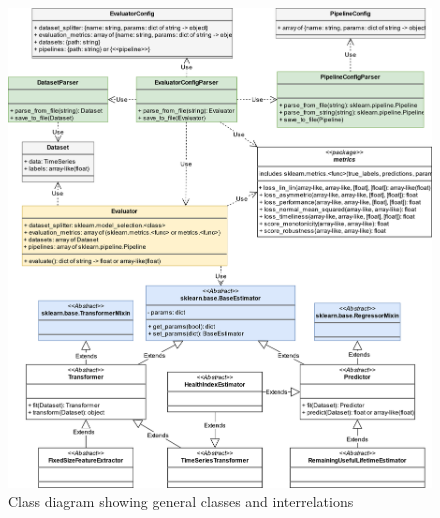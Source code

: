\begin{figure}[ht]
    \centering
    \includegraphics[width=\textwidth]{gfx/general_class_diagram}
    \caption{Class diagram showing general classes and interrelations}
    \label{fig:interfaces-general_class_diagram}
\end{figure}

